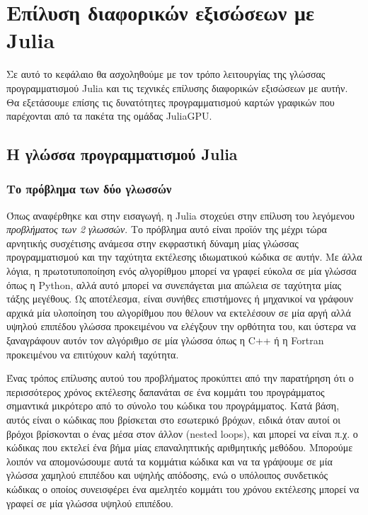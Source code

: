 \chapter{Επίλυση διαφορικών εξισώσεων με Julia}
\label{chapter:julia-diffeq}

Σε αυτό το κεφάλαιο θα ασχοληθούμε με τον τρόπο λειτουργίας της γλώσσας προγραμματισμού Julia και τις τεχνικές επίλυσης διαφορικών εξισώσεων με αυτήν.
Θα εξετάσουμε επίσης τις δυνατότητες προγραμματισμού καρτών γραφικών που παρέχονται από τα πακέτα της ομάδας JuliaGPU.

\section{Η γλώσσα προγραμματισμού Julia}

\subsection{Το πρόβλημα των δύο γλωσσών}

Όπως αναφέρθηκε και στην εισαγωγή, η Julia στοχεύει στην επίλυση του λεγόμενου \emph{προβλήματος των 2 γλωσσών}.
Το πρόβλημα αυτό είναι προϊόν της μέχρι τώρα αρνητικής συσχέτισης ανάμεσα στην εκφραστική δύναμη μίας γλώσσας προγραμματισμού και την ταχύτητα εκτέλεσης ιδιωματικού κώδικα σε αυτήν.
Με άλλα λόγια, η πρωτοτυποποίηση ενός αλγορίθμου μπορεί να γραφεί εύκολα σε μία γλώσσα όπως η Python, αλλά αυτό μπορεί να συνεπάγεται μια απώλεια σε ταχύτητα μίας τάξης μεγέθους.
Ως αποτέλεσμα, είναι συνήθες επιστήμονες ή μηχανικοί να γράφουν αρχικά μία υλοποίηση του αλγορίθμου που θέλουν να εκτελέσουν σε μία αργή αλλά υψηλού επιπέδου γλώσσα προκειμένου να ελέγξουν την ορθότητα του, και ύστερα να ξαναγράφουν αυτόν τον αλγόριθμο σε μία γλώσσα όπως η C++ ή η Fortran προκειμένου να επιτύχουν καλή ταχύτητα.

Ένας τρόπος επίλυσης αυτού του προβλήματος προκύπτει από την παρατήρηση ότι ο περισσότερος χρόνος εκτέλεσης δαπανάται σε ένα κομμάτι του προγράμματος σημαντικά μικρότερο από το σύνολο του κώδικα του προγράμματος.
Κατά βάση, αυτός είναι ο κώδικας που βρίσκεται στο εσωτερικό βρόχων, ειδικά όταν αυτοί οι βρόχοι βρίσκονται ο ένας μέσα στον άλλον (nested loops), και μπορεί να είναι π.χ. ο κώδικας που εκτελεί ένα βήμα μίας επαναληπτικής αριθμητικής μεθόδου.
Μπορούμε λοιπόν να απομονώσουμε αυτά τα κομμάτια κώδικα και να τα γράψουμε σε μία γλώσσα χαμηλού επιπέδου και υψηλής απόδοσης, ενώ ο υπόλοιπος συνδετικός κώδικας ο οποίος συνεισφέρει ένα αμελητέο κομμάτι του χρόνου εκτέλεσης μπορεί να γραφεί σε μία γλώσσα υψηλού επιπέδου.

